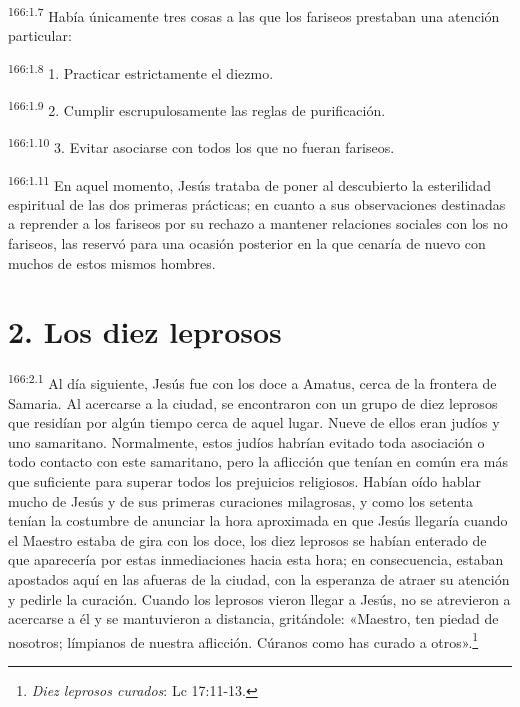 \par 
\textsuperscript{166:1.7} Había únicamente tres cosas a las que los fariseos prestaban una atención particular:

\par 
\textsuperscript{166:1.8} 1. Practicar estrictamente el diezmo.

\par 
\textsuperscript{166:1.9} 2. Cumplir escrupulosamente las reglas de purificación.

\par 
\textsuperscript{166:1.10} 3. Evitar asociarse con todos los que no fueran fariseos.

\par 
\textsuperscript{166:1.11} En aquel momento, Jesús trataba de poner al descubierto la esterilidad espiritual de las dos primeras prácticas; en cuanto a sus observaciones destinadas a reprender a los fariseos por su rechazo a mantener relaciones sociales con los no fariseos, las reservó para una ocasión posterior en la que cenaría de nuevo con muchos de estos mismos hombres.

\section*{2. Los diez leprosos}
\par 
\textsuperscript{166:2.1} Al día siguiente, Jesús fue con los doce a Amatus, cerca de la frontera de Samaria. Al acercarse a la ciudad, se encontraron con un grupo de diez leprosos que residían por algún tiempo cerca de aquel lugar. Nueve de ellos eran judíos y uno samaritano. Normalmente, estos judíos habrían evitado toda asociación o todo contacto con este samaritano, pero la aflicción que tenían en común era más que suficiente para superar todos los prejuicios religiosos. Habían oído hablar mucho de Jesús y de sus primeras curaciones milagrosas, y como los setenta tenían la costumbre de anunciar la hora aproximada en que Jesús llegaría cuando el Maestro estaba de gira con los doce, los diez leprosos se habían enterado de que aparecería por estas inmediaciones hacia esta hora; en consecuencia, estaban apostados aquí en las afueras de la ciudad, con la esperanza de atraer su atención y pedirle la curación. Cuando los leprosos vieron llegar a Jesús, no se atrevieron a acercarse a él y se mantuvieron a distancia, gritándole: «Maestro, ten piedad de nosotros; límpianos de nuestra aflicción. Cúranos como has curado a otros».\footnote{\textit{Diez leprosos curados}: Lc 17:11-13.}

